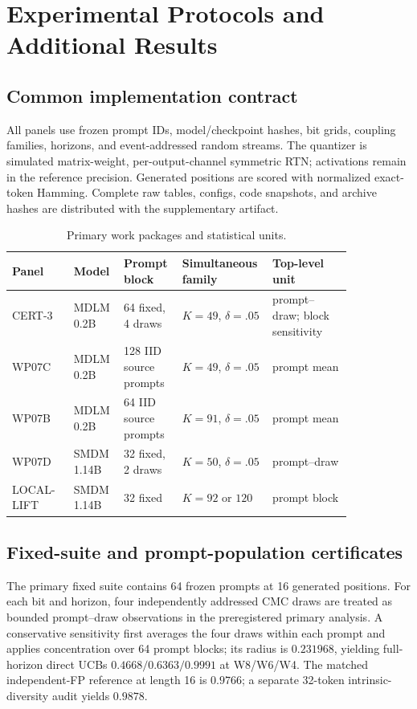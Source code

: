 \section{Experimental Protocols and Additional Results}
\label{app:experiments}

\subsection{Common implementation contract}
All panels use frozen prompt IDs, model/checkpoint hashes, bit grids, coupling families, horizons, and event-addressed random streams. The quantizer is simulated matrix-weight, per-output-channel symmetric RTN; activations remain in the reference precision. Generated positions are scored with normalized exact-token Hamming. Complete raw tables, configs, code snapshots, and archive hashes are distributed with the supplementary artifact.

\begin{table}[ht]
\caption{Primary work packages and statistical units.}
\label{tab:app-panels}
\centering\footnotesize
\setlength{\tabcolsep}{2.5pt}
\begin{tabular}{@{}p{0.17\linewidth}p{0.12\linewidth}p{0.16\linewidth}p{0.17\linewidth}p{0.22\linewidth}@{}}
\toprule
Panel & Model & Prompt block & Simultaneous family & Top-level unit \\
\midrule
CERT-3 & MDLM 0.2B & 64 fixed, 4 draws & $K=49$, $\delta=.05$ & prompt--draw; block sensitivity \\
WP07C & MDLM 0.2B & 128 IID source prompts & $K=49$, $\delta=.05$ & prompt mean \\
WP07B & MDLM 0.2B & 64 IID source prompts & $K=91$, $\delta=.05$ & prompt mean \\
WP07D & SMDM 1.14B & 32 fixed, 2 draws & $K=50$, $\delta=.05$ & prompt--draw \\
LOCAL-LIFT & SMDM 1.14B & 32 fixed & $K=92$ or $120$ & prompt block \\
\bottomrule
\end{tabular}
\end{table}

\subsection{Fixed-suite and prompt-population certificates}
The primary fixed suite contains 64 frozen prompts at 16 generated positions. For each bit and horizon, four independently addressed CMC draws are treated as bounded prompt--draw observations in the preregistered primary analysis. A conservative sensitivity first averages the four draws within each prompt and applies concentration over 64 prompt blocks; its radius is $0.231968$, yielding full-horizon direct UCBs $0.4668/0.6363/0.9991$ at W8/W6/W4. The matched independent-FP reference at length 16 is $0.9766$; a separate 32-token intrinsic-diversity audit yields $0.9878$.

